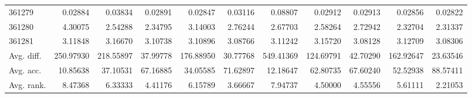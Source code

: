 \begin{tabular}{lrrrrrrrrrr}
361279 & 0.02884 & 0.03834 & 0.02891 & 0.02847 & 0.03116 & 0.08807 & 0.02912 & 0.02913 & 0.02856 & 0.02822 \\
361280 & 4.30075 & 2.54288 & 2.34795 & 3.14003 & 2.76244 & 2.67703 & 2.58264 & 2.72942 & 2.32704 & 2.31337 \\
361281 & 3.11848 & 3.16670 & 3.10738 & 3.10896 & 3.08766 & 3.11242 & 3.15720 & 3.08128 & 3.12709 & 3.08306 \\
Avg. diff. & 250.97930 & 218.55897 & 37.99778 & 176.88950 & 30.77768 & 549.41369 & 124.69791 & 42.70290 & 162.92647 & 23.63546 \\
Avg. acc. & 10.85638 & 37.10531 & 67.16885 & 34.05585 & 71.62897 & 12.18647 & 62.80735 & 67.60240 & 52.52938 & 88.57411 \\
Avg. rank. & 8.47368 & 6.33333 & 4.41176 & 6.15789 & 3.66667 & 7.94737 & 4.50000 & 4.55556 & 5.61111 & 2.21053 \\
\bottomrule
\end{tabular}

